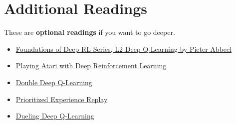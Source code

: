 \documentclass[11pt,a4paper]{article}
\begin{document}
\section{Additional Readings}\label{additional-readings}

These are \textbf{optional readings} if you want to go deeper.

\begin{itemize}
\tightlist
\item
  \href{https://youtu.be/Psrhxy88zww}{Foundations of Deep RL Series, L2 Deep Q-Learning by Pieter Abbeel}
\item
  \href{https://arxiv.org/abs/1312.5602}{Playing Atari with Deep Reinforcement Learning}
\item
  \href{https://papers.nips.cc/paper/2010/hash/091d584fced301b442654dd8c23b3fc9-Abstract.html}{Double Deep Q-Learning}
\item
  \href{https://arxiv.org/abs/1511.05952}{Prioritized Experience Replay}
\item
  \href{https://arxiv.org/abs/1511.06581}{Dueling Deep Q-Learning}
\end{itemize}
\end{document}
